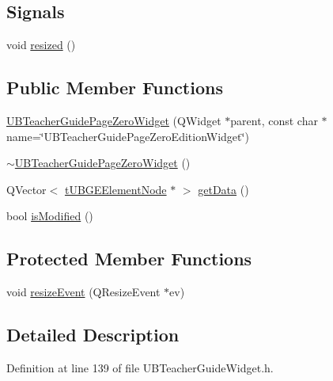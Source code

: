 \subsection*{Signals}
\begin{DoxyCompactItemize}
\item 
void \hyperlink{class_u_b_teacher_guide_page_zero_widget_a04aa38819243fab0ffe3f2af6b1f5ec3}{resized} ()
\end{DoxyCompactItemize}
\subsection*{Public Member Functions}
\begin{DoxyCompactItemize}
\item 
\hyperlink{class_u_b_teacher_guide_page_zero_widget_a54ea93d9571e0b8ddb540f0584a84f81}{U\-B\-Teacher\-Guide\-Page\-Zero\-Widget} (Q\-Widget $\ast$parent, const char $\ast$name=\char`\"{}U\-B\-Teacher\-Guide\-Page\-Zero\-Edition\-Widget\char`\"{})
\item 
\hyperlink{class_u_b_teacher_guide_page_zero_widget_af3adf855249f1f67268c18b33fba6e48}{$\sim$\-U\-B\-Teacher\-Guide\-Page\-Zero\-Widget} ()
\item 
Q\-Vector$<$ \hyperlink{structt_u_b_g_e_element_node}{t\-U\-B\-G\-E\-Element\-Node} $\ast$ $>$ \hyperlink{class_u_b_teacher_guide_page_zero_widget_a7f7f2fb5c692ad282d834872d2946d0b}{get\-Data} ()
\item 
bool \hyperlink{class_u_b_teacher_guide_page_zero_widget_a6e39668afac1561e8fee823846537ace}{is\-Modified} ()
\end{DoxyCompactItemize}
\subsection*{Protected Member Functions}
\begin{DoxyCompactItemize}
\item 
void \hyperlink{class_u_b_teacher_guide_page_zero_widget_a638a93582a0d28f0e88b219c09ac3a0f}{resize\-Event} (Q\-Resize\-Event $\ast$ev)
\end{DoxyCompactItemize}


\subsection{Detailed Description}


Definition at line 139 of file U\-B\-Teacher\-Guide\-Widget.\-h.



